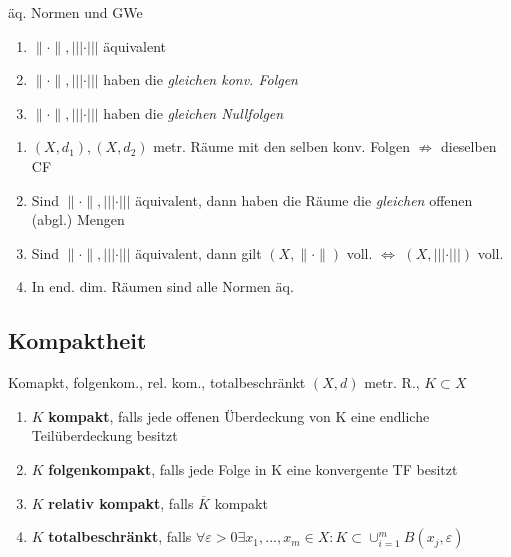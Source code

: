 \begin{satz}{äq. Normen und GWe}
  \begin{enumerate}[label = $\Leftrightarrow$]
    \item $\|\cdot\|, |||\cdot|||$ äquivalent
    \item $\|\cdot\|, |||\cdot|||$ haben die \textit{gleichen konv. Folgen}
    \item $\|\cdot\|, |||\cdot|||$ haben die \textit{gleichen Nullfolgen}
  \end{enumerate}
\end{satz}

\begin{bemerkung}

  \begin{enumerate}[label = (\roman*)]
    \item $(X,d_1),(X,d_2)$ metr. Räume mit den selben konv. Folgen
      $\not\Rightarrow$ dieselben CF
    \item Sind $\|\cdot\|, |||\cdot|||$ äquivalent, dann haben die Räume die
      \textit{gleichen} offenen (abgl.) Mengen
    \item Sind $\|\cdot\|, |||\cdot|||$ äquivalent, dann gilt
      $(X,\|\cdot\|)$ voll. $\Leftrightarrow$ $(X,|||\cdot|||)$ voll.
    \item In end. dim. Räumen sind alle Normen äq.
  \end{enumerate}
\end{bemerkung}



\subsection{Kompaktheit}

\begin{definition}{Komapkt, folgenkom., rel. kom., totalbeschränkt}
  $(X,d)$ metr. R., $K \subset X$
  \begin{enumerate}[label = (\roman*)]
    \item $K$ \textbf{kompakt}, falls jede offenen Überdeckung von K eine
      endliche Teilüberdeckung besitzt
    \item $K$ \textbf{folgenkompakt}, falls jede Folge in K eine konvergente TF
      besitzt
    \item $K$ \textbf{relativ kompakt}, falls $\overline{K}$ kompakt
    \item $K$ \textbf{totalbeschränkt}, falls
      $\forall \varepsilon >0 \exists x_1,...,x_m \in X:
      K \subset \cup_{i=1}^{m}B(x_j,\varepsilon) $
  \end{enumerate}
\end{definition}

